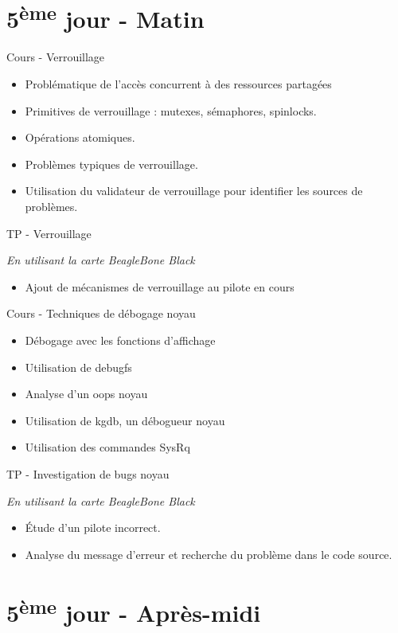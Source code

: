 \documentclass[a4paper,12pt,obeyspaces,spaces,hyphens]{article}
\begin{document}
\section{5\textsuperscript{ème} jour - Matin}

\feagendatwocolumn
{Cours - Verrouillage}
{
  \begin{itemize}
  \item Problématique de l'accès concurrent à des ressources partagées
  \item Primitives de verrouillage : mutexes, sémaphores, spinlocks.
  \item Opérations atomiques.
  \item Problèmes typiques de verrouillage.
  \item Utilisation du validateur de verrouillage pour identifier les
    sources de problèmes.
  \end{itemize}
}
{TP - Verrouillage}
{
  {\em En utilisant la carte BeagleBone Black}
  \begin{itemize}
  \item Ajout de mécanismes de verrouillage au pilote en cours
  \end{itemize}
}

\feagendatwocolumn
{Cours - Techniques de débogage noyau}
{
  \begin{itemize}
  \item Débogage avec les fonctions d'affichage
  \item Utilisation de debugfs
  \item Analyse d'un oops noyau
  \item Utilisation de kgdb, un débogueur noyau
  \item Utilisation des commandes SysRq
  \end{itemize}
}
{TP - Investigation de bugs noyau}
{
  {\em En utilisant la carte BeagleBone Black}
  \begin{itemize}
  \item Étude d'un pilote incorrect.
  \item Analyse du message d'erreur et recherche du problème dans le code
    source.
  \end{itemize}
}

\section{5\textsuperscript{ème} jour - Après-midi}
\end{document}
